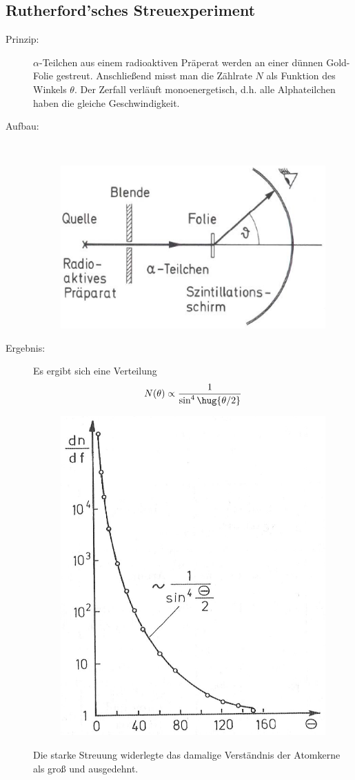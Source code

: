 \documentclass[twocolumn]{summery_4.1}
\begin{document}
\subsection{Rutherford'sches Streuexperiment}
\begin{description}
    \item[Prinzip:] \(\alpha\)-Teilchen aus einem radioaktiven Präperat werden an einer dünnen Gold-Folie gestreut. Anschließend misst man die Zählrate \(N\) als Funktion des Winkels \(\theta\). Der Zerfall verläuft monoenergetisch, d.h. alle Alphateilchen haben die gleiche Geschwindigkeit.
    \item[Aufbau:] \,
    \begin{figure}[H]
        \centering
        \includegraphics[width=.49\textwidth]{Rutherford_Aufbau.png}
    \end{figure}
    \item[Ergebnis:]
    Es ergibt sich eine Verteilung 
    \begin{align*}
        N(\theta) \propto \frac{1}{\sin^4\hug{\theta/2}}
    \end{align*}
    \begin{figure}[H]
        \centering
        \includegraphics[width=.49\textwidth]{Rutherford_Graph.png}
    \end{figure} 
    Die starke Streuung widerlegte das damalige Verständnis der Atomkerne als groß und ausgedehnt.
\end{description}
\end{document}
